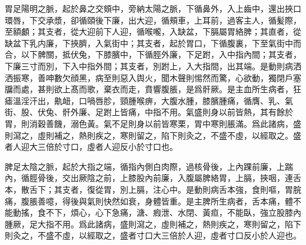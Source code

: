 \documentclass[12pt]{ctexbook}%
\begin{document}
\begin{yuanwen}
胃足陽明之脈，起於鼻之交頞中，旁納太陽之脈，下循鼻外，入上齒中，還出挾口環唇，下交承漿，卻循頤後下廉，出大迎，循頰車，上耳前，過客主人，循髪際，至額顱；其支者，從大迎前下人迎，循喉嚨，入缺盆，下膈屬胃絡脾；其直者，從缺盆下乳内廉，下挾臍，入氣街中；其支者，起於胃口，下循腹裏，下至氣街中而合，以下髀關，抵伏兔，下膝臏中，下循脛外廉，下足跗，入中指內間；其支者，下廉三寸而別，下入中指外間；其支者，別跗上，入大指間，出其端。是動則病洒洒振寒，善呻數欠顔黑，病至則惡入舆火，聞木聲則惕然而驚，心欲動，獨閉戶塞牖而處，甚則欲上髙而歌，棄衣而走，賁響腹脹，是爲骭厥。是主血所生病者，狂瘧溫淫汗出，鼽衄，口喎唇胗，頸腫喉痹，大腹水腫，膝臏腫痛，循膺、乳、氣街、股、伏兔、骭外廉、足跗上皆痛，中指不用。氣盛則身以前皆熱，其有餘於胃，則消穀善饑，溺色黃。氣不足則身以前皆寒栗，胃中寒則脹滿。爲此諸病，盛則瀉之，虛則補之，熱則疾之，寒則留之，陷下則灸之，不盛不虛，以經取之。盛者人迎大三倍於寸口，虛者人迎反小於寸口也。

脾足太陰之脈，起於大指之端，循指內側白肉際，過核骨後，上內踝前廉，上踹內，循脛骨後，交出厥陰之前，上膝股內前廉，入腹屬脾絡胃，上膈，挾咽，連舌本，散舌下；其支者，復從胃，別上膈，注心中。是動則病舌本強，食則嘔，胃脘痛，腹脹善噫，得後與氣則快然如衰，身體皆重。是主脾所生病者，舌本痛，體不能動搖，食不下，煩心，心下急痛，溏、瘕泄、水閉、黃疸，不能臥，強立股膝內腫厥，足大指不用。爲此諸病，盛則瀉之，虛則補之，熱則疾之，寒則留之，陷下則灸之，不盛不虛，以經取之，盛者寸口大三倍於人迎，虛者寸口反小於人迎也。
\end{yuanwen}

\end{document}
